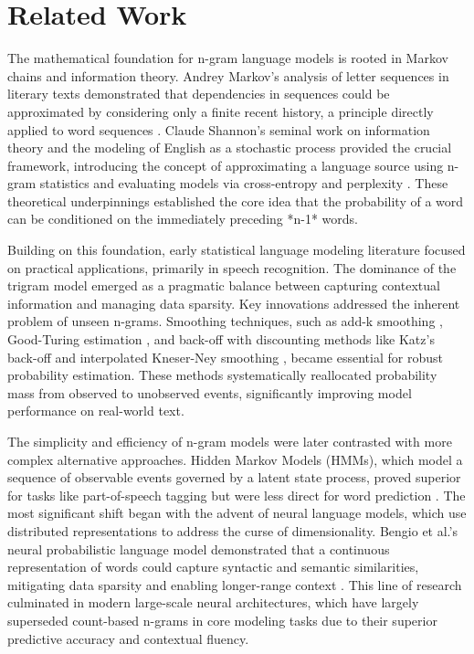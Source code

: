 \documentclass[10pt,a4paper]{article}
\begin{document}
\section{ Related Work }
The mathematical foundation for n-gram language models is rooted in Markov chains and information theory. Andrey Markov's analysis of letter sequences in literary texts demonstrated that dependencies in sequences could be approximated by considering only a finite recent history, a principle directly applied to word sequences \cite{anonndmarkov1913}. Claude Shannon's seminal work on information theory and the modeling of English as a stochastic process provided the crucial framework, introducing the concept of approximating a language source using n-gram statistics and evaluating models via cross-entropy and perplexity \cite{anonndshannon1948}. These theoretical underpinnings established the core idea that the probability of a word can be conditioned on the immediately preceding *n-1* words.

Building on this foundation, early statistical language modeling literature focused on practical applications, primarily in speech recognition. The dominance of the trigram model emerged as a pragmatic balance between capturing contextual information and managing data sparsity. Key innovations addressed the inherent problem of unseen n-grams. Smoothing techniques, such as add-k smoothing \cite{anonndaddk_ref}, Good-Turing estimation \cite{anonndgoodturing1953}, and back-off with discounting methods like Katz's back-off \cite{anonndkatz1987} and interpolated Kneser-Ney smoothing \cite{anonndkneserney1995}, became essential for robust probability estimation. These methods systematically reallocated probability mass from observed to unobserved events, significantly improving model performance on real-world text.

The simplicity and efficiency of n-gram models were later contrasted with more complex alternative approaches. Hidden Markov Models (HMMs), which model a sequence of observable events governed by a latent state process, proved superior for tasks like part-of-speech tagging but were less direct for word prediction \cite{anonndhmm_ref}. The most significant shift began with the advent of neural language models, which use distributed representations to address the curse of dimensionality. Bengio et al.'s neural probabilistic language model demonstrated that a continuous representation of words could capture syntactic and semantic similarities, mitigating data sparsity and enabling longer-range context \cite{anonndbengio2003}. This line of research culminated in modern large-scale neural architectures, which have largely superseded count-based n-grams in core modeling tasks due to their superior predictive accuracy and contextual fluency.
\end{document}

